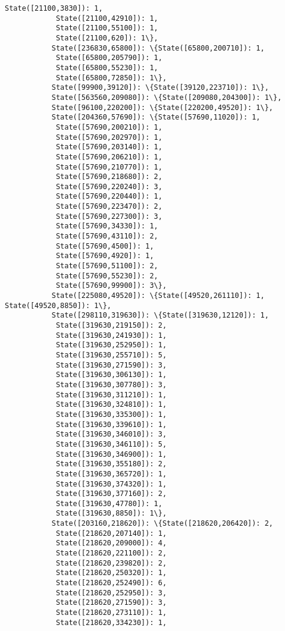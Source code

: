\documentclass[11pt]{article}
\begin{document}
\begin{Verbatim}[commandchars=\\\{\}]
            State([21100,3830]): 1,
            State([21100,42910]): 1,
            State([21100,55100]): 1,
            State([21100,620]): 1\},
           State([236830,65800]): \{State([65800,200710]): 1,
            State([65800,205790]): 1,
            State([65800,55230]): 1,
            State([65800,72850]): 1\},
           State([99900,39120]): \{State([39120,223710]): 1\},
           State([563560,209080]): \{State([209080,204300]): 1\},
           State([96100,220200]): \{State([220200,49520]): 1\},
           State([204360,57690]): \{State([57690,11020]): 1,
            State([57690,200210]): 1,
            State([57690,202970]): 1,
            State([57690,203140]): 1,
            State([57690,206210]): 1,
            State([57690,210770]): 1,
            State([57690,218680]): 2,
            State([57690,220240]): 3,
            State([57690,220440]): 1,
            State([57690,223470]): 2,
            State([57690,227300]): 3,
            State([57690,34330]): 1,
            State([57690,43110]): 2,
            State([57690,4500]): 1,
            State([57690,4920]): 1,
            State([57690,51100]): 2,
            State([57690,55230]): 2,
            State([57690,99900]): 3\},
           State([225080,49520]): \{State([49520,261110]): 1, State([49520,8850]): 1\},
           State([298110,319630]): \{State([319630,12120]): 1,
            State([319630,219150]): 2,
            State([319630,241930]): 1,
            State([319630,252950]): 1,
            State([319630,255710]): 5,
            State([319630,271590]): 3,
            State([319630,306130]): 1,
            State([319630,307780]): 3,
            State([319630,311210]): 1,
            State([319630,324810]): 1,
            State([319630,335300]): 1,
            State([319630,339610]): 1,
            State([319630,346010]): 3,
            State([319630,346110]): 5,
            State([319630,346900]): 1,
            State([319630,355180]): 2,
            State([319630,365720]): 1,
            State([319630,374320]): 1,
            State([319630,377160]): 2,
            State([319630,47780]): 1,
            State([319630,8850]): 1\},
           State([203160,218620]): \{State([218620,206420]): 2,
            State([218620,207140]): 1,
            State([218620,209000]): 4,
            State([218620,221100]): 2,
            State([218620,239820]): 2,
            State([218620,250320]): 1,
            State([218620,252490]): 6,
            State([218620,252950]): 3,
            State([218620,271590]): 3,
            State([218620,273110]): 1,
            State([218620,334230]): 1,

\end{Verbatim}
\end{document}
